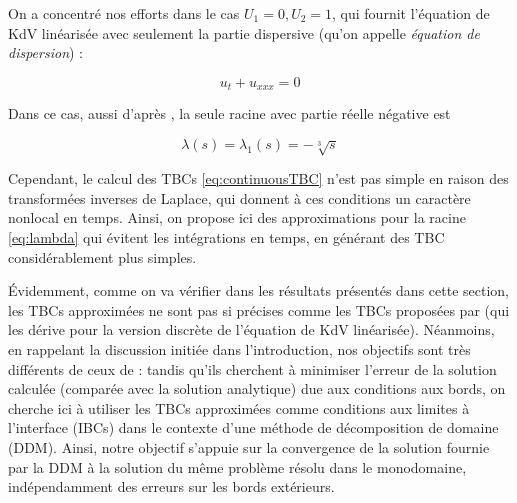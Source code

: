 \indent On a concentré nos efforts dans le cas $U_1 = 0, U_2 = 1$, qui fournit l'équation de KdV linéarisée avec seulement la partie dispersive (qu'on appelle \emph{équation de dispersion}) :

\begin{equation}
	\label{eq:DKdV}
	u_t + u_{xxx} = 0
\end{equation}

\indent Dans ce cas, aussi d'après \cite{zheng2008}, la seule racine avec partie réelle négative est

\begin{equation}
	\label{eq:lambda}
			\lambda(s) = \lambda_1(s) =  -\sqrt[3]{s} 
\end{equation}

\indent Cependant, le calcul des TBCs \eqref{eq:continuousTBC} n'est pas simple en raison des transformées inverses de Laplace, qui donnent à ces conditions un caractère nonlocal en temps. Ainsi, on propose ici des approximations pour la racine \eqref{eq:lambda} qui évitent les intégrations en temps, en générant des TBC considérablement plus simples.


\indent Évidemment, comme on va vérifier dans les résultats présentés dans cette section, les TBCs approximées ne sont pas si précises comme les TBCs proposées par \cite{besse2015} (qui les dérive pour la version discrète de l'équation de KdV linéarisée). Néanmoins, en rappelant la discussion initiée dans l'introduction, nos objectifs sont très différents de ceux de \cite{besse2015} : tandis qu'ils cherchent à minimiser l'erreur de la solution calculée (comparée avec la solution analytique) due aux conditions aux bords, on cherche ici à utiliser les TBCs approximées comme conditions aux limites à l'interface (IBCs) dans le contexte d'une méthode de décomposition de domaine (DDM). Ainsi, notre objectif s'appuie sur la convergence de la solution fournie par la DDM à la solution du même problème résolu dans le monodomaine,  indépendamment des erreurs sur les bords extérieurs. 

